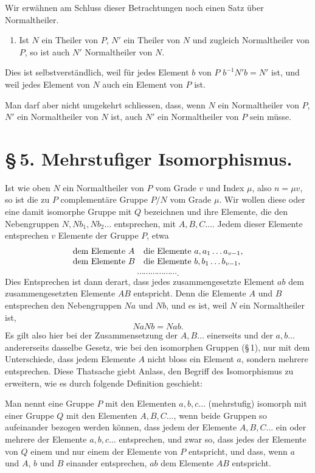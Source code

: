 \documentclass[11pt]{article}
\begin{document}
Wir erwähnen am Schluss dieser Betrachtungen noch einen Satz über Normaltheiler.
\begin{enumerate}[resume,label=\arabic*.]
\item Ist $N$ ein Theiler von $P$, $N'$ ein Theiler von $N$ und zugleich Normaltheiler von $P$, so ist auch $N'$ Normaltheiler von $N$.
\end{enumerate}
Dies ist selbstverständlich, weil für jedes Element $b$ von $P$ $b^{-1}N'b=N'$ ist, und weil jedes Element von $N$ auch ein Element von $P$ ist.

Man darf aber nicht umgekehrt schliessen, dass, wenn $N$ ein Normaltheiler von $P$, $N'$ ein Normaltheiler von $N$ ist, auch $N'$ ein Normaltheiler von $P$ sein müsse.

\section*{\S\,5. Mehrstufiger Isomorphismus.}

Ist wie oben $N$ ein Normaltheiler von $P$ vom Grade $v$ und Index $\mu$, also $n=\mu v$, so ist die zu $P$ complementäre Gruppe $P/N$ vom Grade $\mu$. Wir wollen diese oder eine damit isomorphe Gruppe mit $Q$ bezeichnen und ihre Elemente, die den Nebengruppen $N,Nb_1,Nb_2\ldots$ entsprechen, mit $A,B,C\ldots$. Jedem dieser Elemente entsprechen $v$ Elemente der Gruppe $P$, etwa
\[
\begin{array}{ll}
\hbox{dem Elemente } A & \hbox{die Elemente } a,a_1\ldots a_{v-1},\\
\hbox{dem Elemente } B & \hbox{die Elemente } b,b_1\ldots b_{v-1},
\end{array}
\]
\[
\cdots\cdots\cdots\cdots\cdots\cdots.
\]
Dies Entsprechen ist dann derart, dass jedes zusammengesetzte Element $ab$ dem zusammengesetzten Elemente $AB$ entspricht. Denn die Elemente $A$ und $B$ entsprechen den Nebengruppen $Na$ und $Nb$, und es ist, weil $N$ ein Normaltheiler ist,
\[
NaNb=Nab.
\]
Es gilt also hier bei der Zusammensetzung der $A,B\ldots$ einerseits und der $a,b\ldots$ andererseits dasselbe Gesetz, wie bei den isomorphen Gruppen (\S\,1), nur mit dem Unterschiede, dass jedem Elemente $A$ nicht bloss ein Element $a$, sondern mehrere entsprechen. Diese Thatsache giebt Anlass, den Begriff des Isomorphismus zu erweitern, wie es durch folgende Definition geschieht:

Man nennt eine Gruppe $P$ mit den Elementen $a,b,c\ldots$ (mehrstufig) isomorph mit einer Gruppe $Q$ mit den Elementen $A,B,C\ldots$, wenn beide Gruppen so aufeinander bezogen werden können, dass jedem der Elemente $A,B,C\ldots$ ein oder mehrere der Elemente $a,b,c\ldots$ entsprechen, und zwar so, dass jedes der Elemente von $Q$ einem und nur einem der Elemente von $P$ entspricht, und dass, wenn $a$ und $A$, $b$ und $B$ einander entsprechen, $ab$ dem Elemente $AB$ entspricht.
\end{document}
